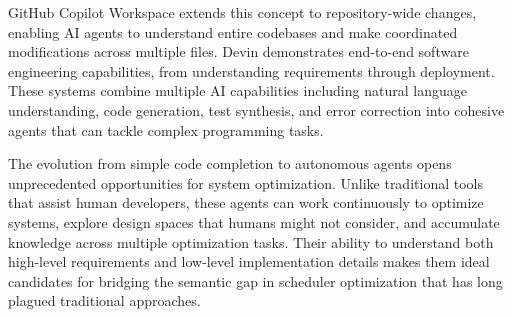 GitHub Copilot Workspace extends this concept to repository-wide changes, enabling AI agents to understand entire codebases and make coordinated modifications across multiple files. Devin demonstrates end-to-end software engineering capabilities, from understanding requirements through deployment. These systems combine multiple AI capabilities including natural language understanding, code generation, test synthesis, and error correction into cohesive agents that can tackle complex programming tasks.

The evolution from simple code completion to autonomous agents opens unprecedented opportunities for system optimization. Unlike traditional tools that assist human developers, these agents can work continuously to optimize systems, explore design spaces that humans might not consider, and accumulate knowledge across multiple optimization tasks. Their ability to understand both high-level requirements and low-level implementation details makes them ideal candidates for bridging the semantic gap in scheduler optimization that has long plagued traditional approaches.